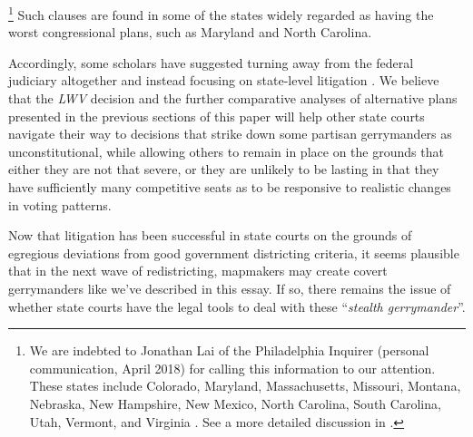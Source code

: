         \footnote{We are indebted to Jonathan Lai of the Philadelphia Inquirer (personal communication, April 2018) for calling this information to our attention. These states include Colorado, Maryland, Massachusetts, Missouri, Montana, Nebraska, New Hampshire, New Mexico, North Carolina, South Carolina, Utah, Vermont, and Virginia \citep[][footnote 86]{Douglas2014_RightToVote}. See a more detailed discussion in \citet{Elmendorf2018}.}
    Such clauses are found in some of the states widely regarded as having the worst congressional plans, such as Maryland and North Carolina.
\par
    Accordingly, some scholars have suggested turning away from the federal judiciary altogether and instead focusing on state-level litigation \citep[e.g. ][]{Wang_et_al_2019_Labortories_UPJCL}. We believe that the \textit{LWV} decision and the further comparative analyses of alternative plans presented in the previous sections of this paper will help other state courts navigate their way to decisions that strike down some partisan gerrymanders as unconstitutional, while allowing others to remain in place on the grounds that either they are not that severe, or they are unlikely to be lasting in that they have sufficiently many competitive seats as to be responsive to realistic changes in voting patterns. 
\par    
    Now that litigation has been successful in state courts on the grounds of egregious deviations from good government districting criteria, it seems plausible that in the next wave of redistricting, mapmakers may create covert gerrymanders like we've described in this essay. If so, there remains the issue of whether state courts have the legal tools to deal with these ``\textit{stealth gerrymander}''.
